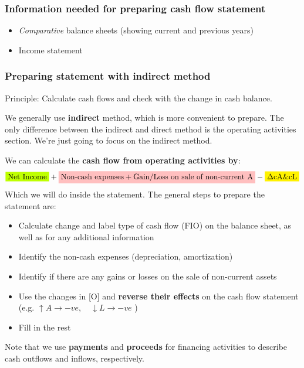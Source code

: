 \subsubsection{Information needed for preparing cash flow statement}
\begin{itemize}
    \item \textit{Comparative} balance sheets (showing current and previous years)
    \item Income statement
\end{itemize}

\subsubsection{Preparing statement with indirect method}

Principle: Calculate cash flows and check with the change in cash balance.

We generally use \textbf{indirect} method, which is more convenient to prepare. The only difference between the indirect and direct method is the operating activities section. We're just going to focus on the indirect method.

We can calculate the \textbf{cash flow from operating activities by}:
\[ \mathcolorbox{lime}{\text{Net Income}} + \mathcolorbox{pink}{\text{Non-cash expenses} + \text{Gain/Loss on sale of non-current A}} - \mathcolorbox{yellow}{\Delta\text{cA\&cL}} \]
Which we will do inside the statement. The general steps to prepare the statement are:
\begin{itemize}
    \item Calculate change and label type of cash flow (FIO) on the balance sheet, as well as for any additional information
    \item Identify the non-cash expenses (depreciation, amortization)
    \item Identify if there are any gains or losses on the sale of non-current assets
    \item Use the changes in [O] and \textbf{reverse their effects} on the cash flow statement\\
          (e.g. $\uparrow A \rightarrow -ve,\quad\downarrow L \rightarrow -ve$ )
    \item Fill in the rest
\end{itemize}

Note that we use \textbf{payments} and \textbf{proceeds} for financing activities to describe cash outflows and inflows, respectively.

